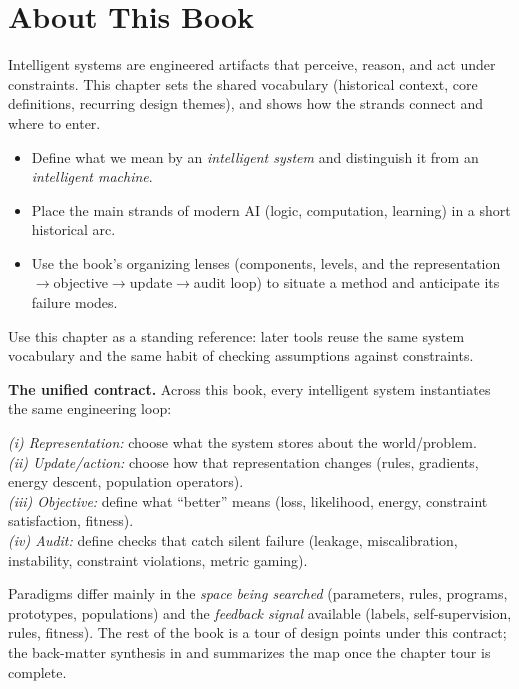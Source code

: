 \section{About This Book}\label{chap:intro}

Intelligent systems are engineered artifacts that perceive, reason, and act under constraints. This chapter sets the shared vocabulary (historical context, core definitions, recurring design themes), and  shows how the strands connect and where to enter.

\begin{tcolorbox}[summarybox, title={Learning Outcomes}]
\begin{itemize}
    \item Define what we mean by an \emph{intelligent system} and distinguish it from an \emph{intelligent machine}.
    \item Place the main strands of modern AI (logic, computation, learning) in a short historical arc.
    \item Use the book's organizing lenses (components, levels, and the representation\(\rightarrow\)objective\(\rightarrow\)update\(\rightarrow\)audit loop) to situate a method and anticipate its failure modes.
\end{itemize}
\end{tcolorbox}

Use this chapter as a standing reference: later tools reuse the same system vocabulary and the same habit of checking assumptions against constraints.

\begin{tcolorbox}[summarybox, title={Design motif}]
\textbf{The unified contract.} Across this book, every intelligent system instantiates the same engineering loop:

\emph{(i) Representation:} choose what the system stores about the world/problem.\\
\emph{(ii) Update/action:} choose how that representation changes (rules, gradients, energy descent, population operators).\\
\emph{(iii) Objective:} define what ``better'' means (loss, likelihood, energy, constraint satisfaction, fitness).\\
\emph{(iv) Audit:} define checks that catch silent failure (leakage, miscalibration, instability, constraint violations, metric gaming).

Paradigms differ mainly in the \emph{space being searched} (parameters, rules, programs, prototypes, populations) and the \emph{feedback signal} available (labels, self\hyp{}supervision, rules, fitness). The rest of the book is a tour of design points under this contract; the back-matter synthesis in  and  summarizes the map once the chapter tour is complete.
\end{tcolorbox}

